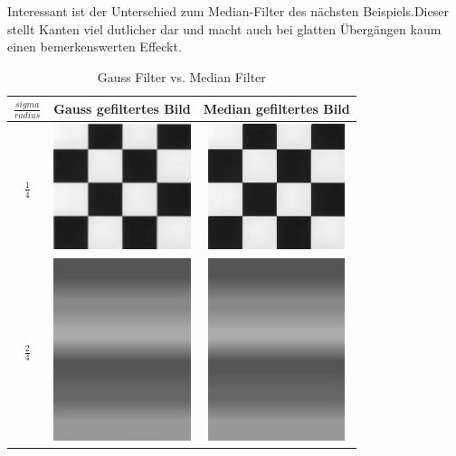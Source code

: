 \documentclass[12pt,german]{article}
\begin{document}
Interessant ist der Unterschied zum Median-Filter des nächsten Beispiels.Dieser stellt Kanten viel dutlicher dar und macht auch bei glatten Übergängen kaum einen bemerkenswerten Effeckt.



\begin{table}[H]
	\centering
	\begin{tabular}{|c  | c | c |}
    
    \hline
    $ \frac{sigma}{radius} $ & Gauss gefiltertes Bild & Median gefiltertes Bild \\
    \hline
    $ \frac{1}{4} $ &
	\includegraphics[width=4cm]{../testData/Gauss/SchachbrettR4S2.jpg} & 	\includegraphics[width=4cm]{../testData/Median/SchachbrettR4.jpg} \\
	    \hline
    $ \frac{2}{4} $ &
	\includegraphics[width=4cm]{../testData/Gauss/RegenbogenR4S2.jpg} & 	\includegraphics[width=4cm]{../testData/Median/RegenbogenR4.jpg} \\
  \end{tabular}
  \caption{Gauss Filter vs. Median Filter}
  \label{tab:GaussMedianFilterEvaluierung}
\end{table}
\end{document}
